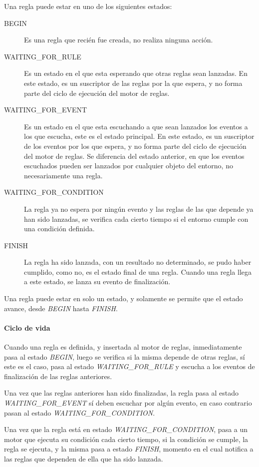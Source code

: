 Una regla puede estar en uno de los siguientes estados:

\begin{description}
\item[BEGIN] Es una regla que recién fue creada, no realiza ninguna
	acción.
\item[WAITING\_FOR\_RULE] Es un estado en el que esta esperando que otras reglas
	sean lanzadas. En este estado, es un suscriptor de las reglas por la que
	espera, y no forma parte del ciclo de ejecución del motor de reglas.
\item[WAITING\_FOR\_EVENT] Es un estado en el que esta escuchando a que sean
	lanzados los eventos a los que escucha, este es el estado principal. En
	este estado, es un suscriptor de los eventos por los que espera, y no
	forma parte del ciclo de ejecución del motor de reglas. Se diferencia
	del estado anterior, en que los eventos escuchados pueden ser lanzados
	por cualquier objeto del entorno, no necesariamente una regla.
\item[WAITING\_FOR\_CONDITION] La regla ya no espera por ningún evento y las
	reglas de las que depende ya han sido lanzadas, se verifica cada cierto
	tiempo si el entorno cumple con una condición definida. 
\item[FINISH] La regla ha sido lanzada, con un resultado no determinado, se pudo
	haber cumplido, como no, es el estado final de una regla. Cuando una
	regla llega a este estado, se lanza su evento de finalización.
\end{description}

Una regla puede estar en solo un estado, y solamente se permite que el estado
avance, desde \emph{BEGIN} hasta \emph{FINISH}.


\paragraph{Ciclo de vida}

Cuando una regla es definida, y insertada al motor de reglas, inmediatamente
pasa al estado \emph{BEGIN}, luego se verifica si la misma depende de otras
reglas, sí este es el caso, pasa al estado \emph{WAITING\_FOR\_RULE} y escucha a
los eventos de finalización de las reglas anteriores.

Una vez que las reglas anteriores han sido finalizadas, la regla pasa al estado
\emph{WAITING\_FOR\_EVENT} sí deben escuchar por algún evento, en caso contrario
pasan al estado \emph{WAITING\_FOR\_CONDITION}.

Una vez que la regla está en estado \emph{WAITING\_FOR\_CONDITION}, pasa a un
motor que ejecuta su condición cada cierto tiempo, si la condición se cumple, la
regla se ejecuta, y la misma pasa a estado \emph{FINISH}, momento en el cual
notifica a las reglas que dependen de ella que ha sido lanzada.

